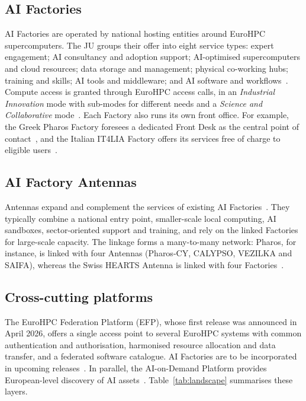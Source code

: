 \documentclass[conference,a4paper]{IEEEtran}
\begin{document}
\subsection{AI Factories}
AI Factories are operated by national hosting entities around EuroHPC supercomputers. The JU groups their offer into eight service types: expert engagement; AI consultancy and adoption support; AI-optimised supercomputers and cloud resources; data storage and management; physical co-working hubs; training and skills; AI tools and middleware; and AI software and workflows~\cite{eurohpc_aif_services}. Compute access is granted through EuroHPC access calls, in an \emph{Industrial Innovation} mode with sub-modes for different needs and a \emph{Science and Collaborative} mode~\cite{eurohpc_aif_access}. Each Factory also runs its own front office. For example, the Greek Pharos Factory foresees a dedicated Front Desk as the central point of contact~\cite{eurohpc_pharos}, and the Italian IT4LIA Factory offers its services free of charge to eligible users~\cite{eurohpc_it4lia}.

\subsection{AI Factory Antennas}
Antennas expand and complement the services of existing AI Factories~\cite{eurohpc_antennas_page}. They typically combine a national entry point, smaller-scale local computing, AI sandboxes, sector-oriented support and training, and rely on the linked Factories for large-scale capacity. The linkage forms a many-to-many network: Pharos, for instance, is linked with four Antennas (Pharos-CY, CALYPSO, VEZILKA and SAIFA), whereas the Swiss HEARTS Antenna is linked with four Factories~\cite{eurohpc_antennas}.

\subsection{Cross-cutting platforms}
The EuroHPC Federation Platform (EFP), whose first release was announced in April 2026, offers a single access point to several EuroHPC systems with common authentication and authorisation, harmonised resource allocation and data transfer, and a federated software catalogue. AI Factories are to be incorporated in upcoming releases~\cite{eurohpc_efp}. In parallel, the AI-on-Demand Platform provides European-level discovery of AI assets~\cite{aiod}. Table~\ref{tab:landscape} summarises these layers.
\end{document}
